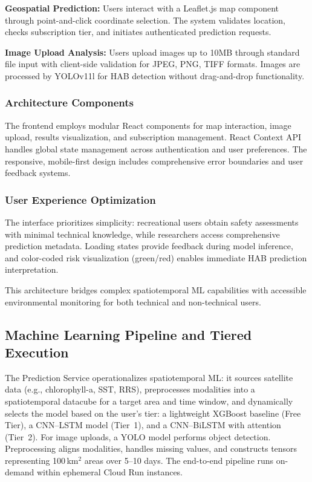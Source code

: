\documentclass[conference]{IEEEtran}
\begin{document}
\textbf{Geospatial Prediction:} Users interact with a Leaflet.js map component through point-and-click coordinate selection. The system validates location, checks subscription tier, and initiates authenticated prediction requests.

\textbf{Image Upload Analysis:} Users upload images up to 10MB through standard file input with client-side validation for JPEG, PNG, TIFF formats. Images are processed by YOLOv11l for HAB detection without drag-and-drop functionality.

\subsubsection{Architecture Components}
The frontend employs modular React components for map interaction, image upload, results visualization, and subscription management. React Context API handles global state management across authentication and user preferences. The responsive, mobile-first design includes comprehensive error boundaries and user feedback systems.

\subsubsection{User Experience Optimization}
The interface prioritizes simplicity: recreational users obtain safety assessments with minimal technical knowledge, while researchers access comprehensive prediction metadata. Loading states provide feedback during model inference, and color-coded risk visualization (green/red) enables immediate HAB prediction interpretation.

This architecture bridges complex spatiotemporal ML capabilities with accessible environmental monitoring for both technical and non-technical users.

\subsection{Machine Learning Pipeline and Tiered Execution}

The Prediction Service operationalizes spatiotemporal ML: it sources satellite data (e.g., chlorophyll-a, SST, RRS), preprocesses modalities into a spatiotemporal datacube for a target area and time window, and dynamically selects the model based on the user's tier: a lightweight XGBoost baseline (Free Tier), a CNN--LSTM model (Tier~1), and a CNN--BiLSTM with attention (Tier~2). For image uploads, a YOLO model performs object detection.
Preprocessing aligns modalities, handles missing values, and constructs tensors representing 100\,km$^2$ areas over 5--10 days. The end-to-end pipeline runs on-demand within ephemeral Cloud Run instances.
\end{document}
